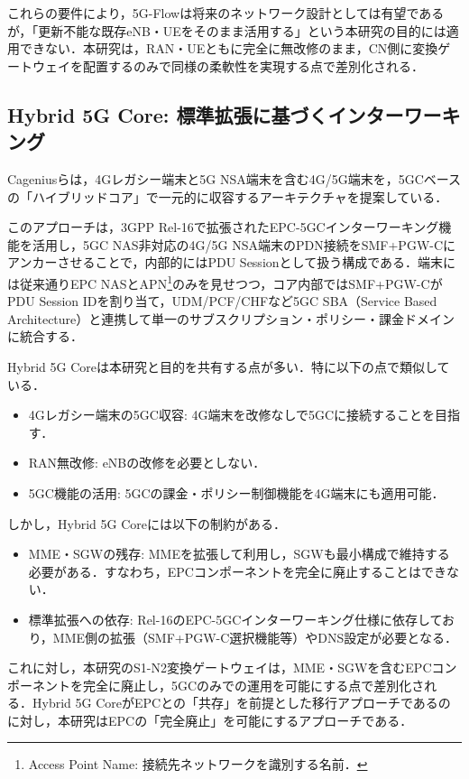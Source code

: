 これらの要件により，5G-Flowは将来のネットワーク設計としては有望であるが，「更新不能な既存eNB・UEをそのまま活用する」という本研究の目的には適用できない．本研究は，RAN・UEともに完全に無改修のまま，CN側に変換ゲートウェイを配置するのみで同様の柔軟性を実現する点で差別化される．

\subsection{Hybrid 5G Core: 標準拡張に基づくインターワーキング}

Cageniusらは，4Gレガシー端末と5G NSA端末を含む4G/5G端末を，5GCベースの「ハイブリッドコア」で一元的に収容するアーキテクチャを提案している\cite{Cagenius2024_Hybrid5GCore}．

このアプローチは，3GPP Rel-16で拡張されたEPC-5GCインターワーキング機能を活用し，5GC NAS非対応の4G/5G NSA端末のPDN接続をSMF+PGW-Cにアンカーさせることで，内部的にはPDU Sessionとして扱う構成である．端末には従来通りEPC NASとAPN\footnote{Access Point Name: 接続先ネットワークを識別する名前．}のみを見せつつ，コア内部ではSMF+PGW-CがPDU Session IDを割り当て，UDM/PCF/CHFなど5GC SBA（Service Based Architecture）と連携して単一のサブスクリプション・ポリシー・課金ドメインに統合する．

Hybrid 5G Coreは本研究と目的を共有する点が多い．特に以下の点で類似している．
\begin{itemize}
    \item 4Gレガシー端末の5GC収容: 4G端末を改修なしで5GCに接続することを目指す．
    \item RAN無改修: eNBの改修を必要としない．
    \item 5GC機能の活用: 5GCの課金・ポリシー制御機能を4G端末にも適用可能．
\end{itemize}

しかし，Hybrid 5G Coreには以下の制約がある．
\begin{itemize}
    \item MME・SGWの残存: MMEを拡張して利用し，SGWも最小構成で維持する必要がある．すなわち，EPCコンポーネントを完全に廃止することはできない．
    \item 標準拡張への依存: Rel-16のEPC-5GCインターワーキング仕様に依存しており，MME側の拡張（SMF+PGW-C選択機能等）やDNS設定が必要となる．
\end{itemize}

これに対し，本研究のS1-N2変換ゲートウェイは，MME・SGWを含むEPCコンポーネントを完全に廃止し，5GCのみでの運用を可能にする点で差別化される．Hybrid 5G CoreがEPCとの「共存」を前提とした移行アプローチであるのに対し，本研究はEPCの「完全廃止」を可能にするアプローチである．

